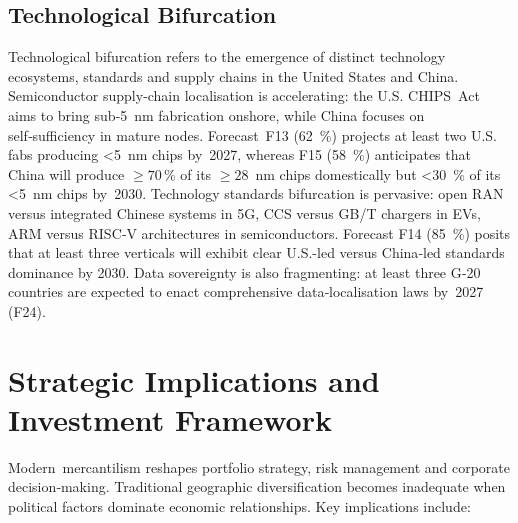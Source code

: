 \documentclass{article}
\begin{document}
\subsection{Technological Bifurcation}

Technological bifurcation refers to the emergence of distinct technology ecosystems, standards and supply chains in the United States and China.  Semiconductor supply‑chain localisation is accelerating: the U.S. CHIPS Act aims to bring sub‑5 nm fabrication onshore, while China focuses on self‑sufficiency in mature nodes.  Forecast F13 (62 \%) projects at least two U.S. fabs producing <5 nm chips by 2027, whereas F15 (58 \%) anticipates that China will produce \(\geq 70\,\%\) of its \(\geq 28\) nm chips domestically but <30 \% of its <5 nm chips by 2030.  Technology standards bifurcation is pervasive: open RAN versus integrated Chinese systems in 5G, CCS versus GB/T chargers in EVs, ARM versus RISC‑V architectures in semiconductors.  Forecast F14 (85 \%) posits that at least three verticals will exhibit clear U.S.-led versus China‑led standards dominance by 2030.  Data sovereignty is also fragmenting: at least three G‑20 countries are expected to enact comprehensive data‑localisation laws by 2027 (F24).

\section{Strategic Implications and Investment Framework}

Modern mercantilism reshapes portfolio strategy, risk management and corporate decision‑making.  Traditional geographic diversification becomes inadequate when political factors dominate economic relationships.  Key implications include:
\end{document}
